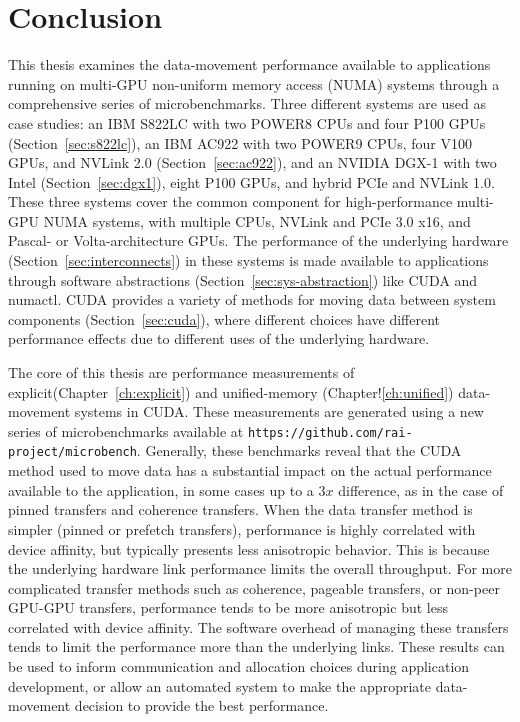 \chapter{Conclusion}
\label{ch:conclusion}

This thesis examines the data-movement performance available to applications running on multi-GPU non-uniform memory access (NUMA) systems through a comprehensive series of microbenchmarks.
Three different systems are used as case studies: an IBM S822LC with two POWER8 CPUs and four P100 GPUs (Section~\ref{sec:s822lc}), an IBM AC922 with two POWER9 CPUs, four V100 GPUs, and NVLink 2.0 (Section~\ref{sec:ac922}), and an NVIDIA DGX-1 with two Intel (Section~\ref{sec:dgx1}), eight P100 GPUs, and hybrid PCIe and NVLink 1.0.
These three systems cover the common component for high-performance multi-GPU NUMA systems, with multiple CPUs, NVLink and PCIe 3.0 x16, and Pascal- or Volta-architecture GPUs.
The performance of the underlying hardware (Section~\ref{sec:interconnects}) in these systems is made available to applications through software abstractions (Section~\ref{sec:sys-abstraction}) like CUDA and numactl.
CUDA provides a variety of methods for moving data between system components (Section~\ref{sec:cuda}), where different choices have different performance effects due to different uses of the underlying hardware.

The core of this thesis are performance measurements of explicit(Chapter~\ref{ch:explicit}) and unified-memory (Chapter!\ref{ch:unified}) data-movement systems in CUDA.
These measurements are generated using a new series of microbenchmarks available at \texttt{https://github.com/rai-project/microbench}.
Generally, these benchmarks reveal that the CUDA method used to move data has a substantial impact on the actual performance available to the application, in some cases up to a $3x$ difference, as in the case of pinned transfers and coherence transfers.
When the data transfer method is simpler (pinned or prefetch transfers), performance is highly correlated with device affinity, but typically presents less anisotropic behavior.
This is because the underlying hardware link performance limits the overall throughput.
For more complicated transfer methods such as coherence, pageable transfers, or non-peer GPU-GPU transfers, performance tends to be more anisotropic but less correlated with device affinity.
The software overhead of managing these transfers tends to limit the performance more than the underlying links.
These results can be used to inform communication and allocation choices during application development, or allow an automated system to make the appropriate data-movement decision to provide the best performance.


